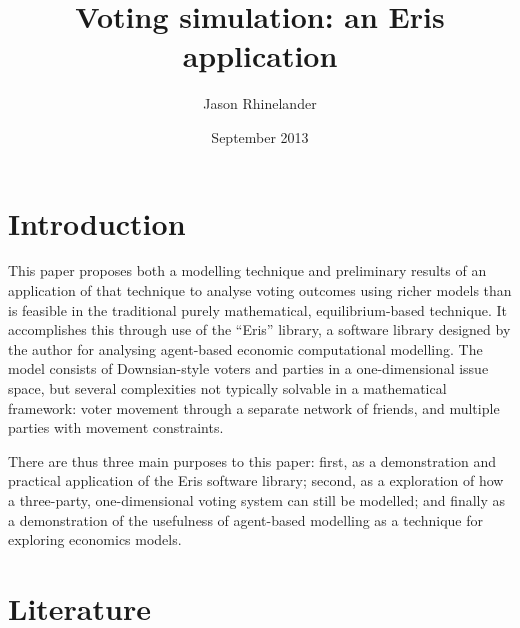 \documentclass[12pt]{article}
\title{Voting simulation: an Eris application}
\date{September 2013}
\author{Jason Rhinelander}
\numberwithin{equation}{subsection}
\begin{document}
\maketitle
\thispagestyle{empty}



\section{Introduction}\label{s:intro}

This paper proposes both a modelling technique and preliminary results of an application of that
technique to analyse voting outcomes using richer models than is feasible in the traditional purely
mathematical, equilibrium-based technique.  It accomplishes this through use of the ``Eris''
library, a software library designed by the author for analysing agent-based economic computational
modelling.  The model consists of Downsian-style voters and parties in a one-dimensional issue
space, but several complexities not typically solvable in a mathematical framework: voter movement
through a separate network of friends, and multiple parties with movement constraints.

There are thus three main purposes to this paper: first, as a demonstration and practical
application of the Eris software library; second, as a exploration of how a three-party,
one-dimensional voting system can still be modelled; and finally as a demonstration of the
usefulness of agent-based modelling as a technique for exploring economics models.

\section{Literature}\label{s:lit}
\end{document}
